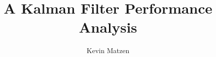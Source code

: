 \documentclass[10pt,twocolumn,letterpaper]{article}
\begin{document}


\title{A Kalman Filter Performance Analysis}

\author{Kevin Matzen}

\maketitle
\twocolumngrid







{\small


}

\pagebreak
\onecolumngrid
\appendix

\end{document}
